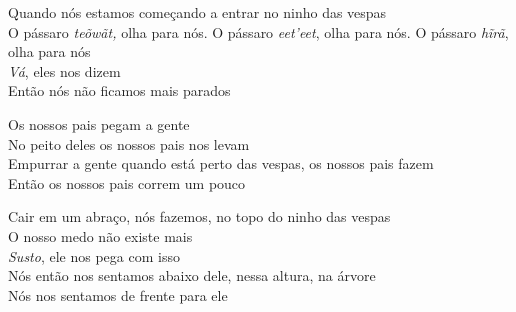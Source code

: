 \bigskip

\begin{linenumbers}\begingroup\raggedright
 
\noindent   Quando nós estamos começando a entrar no ninho das vespas\\
  O pássaro \emph{teõwãt,} olha para nós. O pássaro \emph{eet'eet},
 olha para nós. O pássaro \emph{hĩrã}, olha para nós\\
  \emph{Vá}, eles nos dizem\\
  Então nós não ficamos mais parados
 
\end{linenumbers}\endgroup

\bigskip

\begin{linenumbers}\begingroup\raggedright
 
\noindent   Os nossos pais pegam a gente\\
  No peito deles os nossos pais nos levam\\
  Empurrar a gente quando está perto das vespas, os nossos pais fazem\\
  Então os nossos pais correm um pouco
 
\end{linenumbers}\endgroup

\bigskip

\begin{linenumbers}\begingroup\raggedright
 
\noindent   Cair em um abraço, nós fazemos, no topo do ninho das vespas\\
  O nosso medo não existe mais\\
  \emph{Susto}, ele nos pega com isso\\
  Nós então nos sentamos abaixo dele, nessa altura, na árvore\\
  Nós nos sentamos de frente para ele
 
\end{linenumbers}\endgroup

